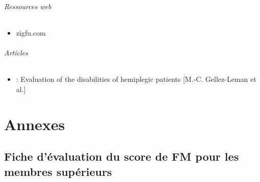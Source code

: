 \documentclass[french,12pt]{report}
\begin{document}
			\paragraph{Ressources web}
				\begin{itemize}
					\item zigfu.com
				\end{itemize}
			\paragraph{Articles}
				\begin {itemize}
					\item : Evaluation of the disabilities of hemiplegic patients [M.-C. Gellez-Leman et al.] \label{ref_analyse_litterature}
				\end{itemize}
				
\part{Annexes}
	\chapter{Fiche d'évaluation du score de FM pour les membres supérieurs} \label{evaluation_FM}
\end{document}
